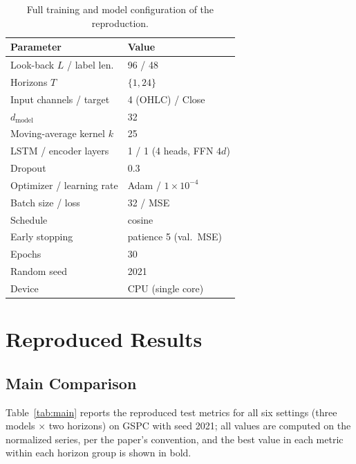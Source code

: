\documentclass[conference]{IEEEtran}
\begin{document}
\begin{table}[!t]
\centering
\caption{Full training and model configuration of the reproduction.}
\label{tab:hparam}
\small
\begin{tabular}{@{}p{3.0cm}p{4.0cm}@{}}
\toprule
Parameter & Value \\
\midrule
Look-back $L$ / label len. & 96 / 48 \\
Horizons $T$ & $\{1, 24\}$ \\
Input channels / target & 4 (OHLC) / Close \\
$d_{\mathrm{model}}$ & 32 \\
Moving-average kernel $k$ & 25 \\
LSTM / encoder layers & 1 / 1 (4 heads, FFN $4d$) \\
Dropout & 0.3 \\
Optimizer / learning rate & Adam / $1{\times}10^{-4}$ \\
Batch size / loss & 32 / MSE \\
Schedule & cosine \\
Early stopping & patience 5 (val.\ MSE) \\
Epochs & 30 \\
Random seed & 2021 \\
Device & CPU (single core) \\
\bottomrule
\end{tabular}
\end{table}

\section{Reproduced Results}
\label{sec:results}

\subsection{Main Comparison}

Table~\ref{tab:main} reports the reproduced test metrics for all six
settings (three models $\times$ two horizons) on GSPC with seed 2021; all
values are computed on the normalized series, per the paper's convention,
and the best value in each metric within each horizon group is shown in
bold.
\end{document}
